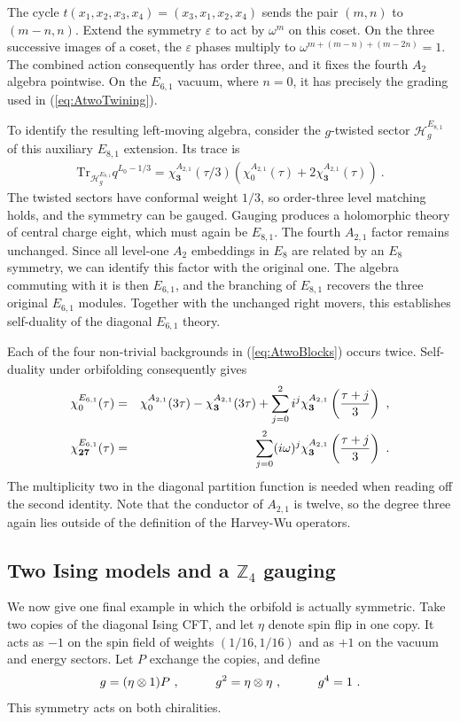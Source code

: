 \documentclass[12pt]{article}
\numberwithin{equation}{section}
\newcommand{\bea}{\begin{eqnarray}}
\newcommand{\eea}{\end{eqnarray}}
\def\no{\nonumber}
\def\ZZ{\mathbb{Z}}
\newcommand{\Tr}{\mathrm{Tr}}
\theoremstyle{remark}
\begin{document}
The cycle $t(x_1,x_2,x_3,x_4)=(x_3,x_1,x_2,x_4)$ sends the pair $(m,n)$ to $(m-n,n)$. Extend the symmetry $\varepsilon$ to act by $\omega^m$ on this coset. On the three successive images of a coset, the $\varepsilon$ phases multiply to $\omega^{m+(m-n)+(m-2n)}=1$. The combined action consequently has order three, and it fixes the fourth $A_2$ algebra pointwise. On the $E_{6,1}$ vacuum, where $n=0$, it has precisely the grading used in (\ref{eq:AtwoTwining}).

To identify the resulting left-moving algebra, consider the $g$-twisted sector $\mathcal H^{E_{8,1}}_g$ of this auxiliary $E_{8,1}$ extension. Its trace is
\bea
\Tr_{\mathcal H^{E_{8,1}}_g}q^{L_0-1/3}=\chi^{A_{2,1}}_{\mathbf3}(\tau/3)\left(\chi^{A_{2,1}}_0(\tau)+2\chi^{A_{2,1}}_{\mathbf3}(\tau)\right)~.
\eea
The twisted sectors have conformal weight $1/3$, so order-three level matching holds, and the symmetry can be gauged. Gauging produces a holomorphic theory of central charge eight, which must again be $E_{8,1}$. The fourth $A_{2,1}$ factor remains unchanged. Since all level-one $A_2$ embeddings in $E_8$ are related by an $E_8$ symmetry, we can identify this factor with the original one. The algebra commuting with it is then $E_{6,1}$, and the branching of $E_{8,1}$ recovers the three original $E_{6,1}$ modules. Together with the unchanged right movers, this establishes self-duality of the diagonal $E_{6,1}$ theory.

Each of the four non-trivial backgrounds in (\ref{eq:AtwoBlocks}) occurs twice. Self-duality under orbifolding consequently gives
\bea
\chi^{E_{6,1}}_0(\tau)&=&\chi^{A_{2,1}}_0(3\tau)-\chi^{A_{2,1}}_{\mathbf3}(3\tau)+\sum_{j=0}^2i^j\chi^{A_{2,1}}_{\mathbf3}\left({\tau+j\over 3}\right)~,\no\\
\chi^{E_{6,1}}_{\mathbf{27}}(\tau)&=&\sum_{j=0}^2(i\omega)^j\chi^{A_{2,1}}_{\mathbf3}\left({\tau+j\over 3}\right)~.
\eea
The multiplicity two in the diagonal partition function is needed when reading off the second identity. 
Note that the conductor of $A_{2,1}$ is twelve, so the degree three again lies outside of the definition of the Harvey-Wu operators.



\subsection{Two Ising models and a $\ZZ_4$ gauging}
\label{sec:IsingPair}

We now give one final example in which the orbifold is actually symmetric. Take two copies of the diagonal Ising CFT, and let $\eta$ denote spin flip in one copy. It acts as $-1$ on the spin field of weights $(1/16,1/16)$ and as $+1$ on the vacuum and energy sectors. Let $P$ exchange the copies, and define
\bea 
g=(\eta\otimes1)P~,
\hspace{0.4 in}g^2=\eta\otimes\eta~,
\hspace{0.4 in}g^4=1~.
\eea
This symmetry acts on both chiralities. 
\end{document}
